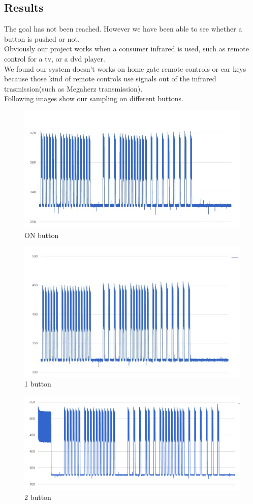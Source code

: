 \subsection{Results}

The goal has not been reached. However we have been able to see whether a button is pushed or not.\\
Obviously our project works when a consumer infrared is used, such as remote control for a tv, or a dvd player.\\
We found our system doesn't works on home gate remote controls or car keys because those kind of remote controls use signals out of the infrared trasmission(such as Megaherz transmission).\\
Following images show our sampling on different buttons.

\begin{figure}[h]
	\centering
	\includegraphics[scale=0.3]{graphs/onButton_2.jpg}%
	\caption{ON button}

\end{figure}

\begin{figure}[h]
	\centering
	\includegraphics[scale=0.3]{graphs/1Button.jpg}%
	\caption{1 button}
		
\end{figure}

\begin{figure}[h]
	\centering
	\includegraphics[scale=0.25]{graphs/nonSoIlTasto_1.jpg}%
	\caption{2 button}
	
\end{figure}

